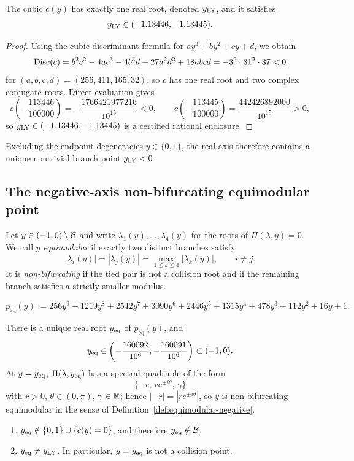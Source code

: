 \begin{proposition}\label{prop:unique-real-root}
The cubic $c(y)$ has exactly one real root, denoted $y_{\mathrm{LY}}$, and it satisfies
\[
y_{\mathrm{LY}}\in(-1.13446,-1.13445).
\]
\end{proposition}

\begin{proof}
Using the cubic discriminant formula for $a y^3+b y^2+c y+d$, we obtain
\[
\operatorname{Disc}(c)=b^2c^2-4ac^3-4b^3d-27a^2d^2+18abcd= -3^9\cdot 31^2\cdot 37<0
\]
for $(a,b,c,d)=(256,411,165,32)$, so $c$ has one real root and two complex conjugate roots.
Direct evaluation gives
\[
c\!\left(-\frac{113446}{100000}\right)=-\frac{1766421977216}{10^{15}}<0,\qquad
c\!\left(-\frac{113445}{100000}\right)=\frac{442426892000}{10^{15}}>0,
\]
so $y_{\mathrm{LY}}\in(-1.13446,-1.13445)$ is a certified rational enclosure.
\end{proof}

Excluding the endpoint degeneracies $y\in\{0,1\}$, the real axis therefore contains a unique nontrivial branch point $y_{\mathrm{LY}}<0$.

\subsection{The negative-axis non-bifurcating equimodular point}

\begin{definition}\label{def:equimodular-negative}
Let $y\in(-1,0)\setminus\mathcal{B}$ and write $\lambda_1(y),\dots,\lambda_4(y)$ for the roots of $\Pi(\lambda,y)=0$.
We call $y$ \emph{equimodular} if exactly two distinct branches satisfy
\[
|\lambda_i(y)|=|\lambda_j(y)|=\max_{1\le k\le4}|\lambda_k(y)|,\qquad i\neq j.
\]
It is \emph{non-bifurcating} if the tied pair is not a collision root and if the remaining branch satisfies a strictly smaller modulus.
\end{definition}

\begin{equation}\label{eq:p-eq}
p_{\mathrm{eq}}(y):=256 y^9+1219 y^8+2542 y^7+3090 y^6+2446 y^5+1315 y^4+478 y^3+112 y^2+16 y+1.
\end{equation}

\begin{theorem}\label{thm:yeq}
There is a unique real root \(y_{\mathrm{eq}}\) of \(p_{\mathrm{eq}}(y)\), and
\[
y_{\mathrm{eq}}\in\left(-\frac{160092}{10^6},-\frac{160091}{10^6}\right)\subset(-1,0).
\]
At \(y=y_{\mathrm{eq}}\), \(\Pi(\lambda,y_{\mathrm{eq}})\) has a spectral quadruple of the form
\[
\{-r,\, r e^{\pm i\theta},\,\gamma\}
\]
with \(r>0\), \(\theta\in(0,\pi)\), \(\gamma\in\mathbb{R}\); hence \(|-r|=|r e^{\pm i\theta}|\), so \(y\) is non-bifurcating equimodular in the sense of Definition~\ref{def:equimodular-negative}.
\begin{enumerate}
\item\label{thm:yeq-a} \( y_{\mathrm{eq}}\notin\{0,1\}\cup\{c(y)=0\}\), and therefore \(y_{\mathrm{eq}}\notin\mathcal{B}\).
\item\label{thm:yeq-b} \(y_{\mathrm{eq}}\neq y_{\mathrm{LY}}\). In particular, \(y=y_{\mathrm{eq}}\) is not a collision point.
\end{enumerate}
\end{theorem}

